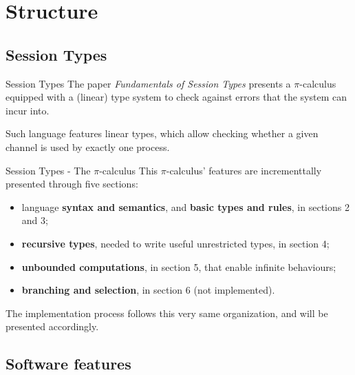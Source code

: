 \section{Structure}

\subsection*{Session Types}

\begin{frame}{Session Types}
    The paper \emph{Fundamentals of Session Types} %
    presents a $\pi$-calculus equipped with a (linear) type system to check against errors that the system can incur into.

    \vspace{0.5cm}

    Such language features linear types, which allow checking whether a given channel is used by exactly one process.
\end{frame}

\begin{frame}{Session Types - The $\pi$-calculus}
    This $\pi$-calculus' features are incrementtally presented through five sections:
    \begin{itemize}
        \item language \textbf{syntax and semantics}, and \textbf{basic types and rules}, in sections 2 and 3;
        \item \textbf{recursive types}, needed to write useful unrestricted types, in section 4;
        \item \textbf{unbounded computations}, in section 5, that enable infinite behaviours;
        \item \textbf{branching and selection}, in section 6 (not implemented).
    \end{itemize}

    The implementation process follows this very same organization, and will be presented accordingly.
\end{frame}

\subsection*{Software features}

